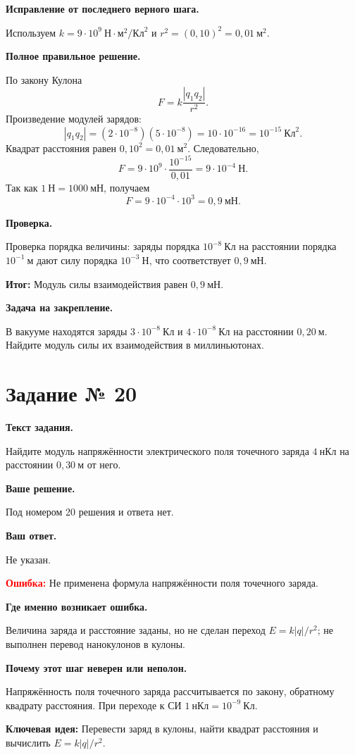 \documentclass[11pt,a4paper]{article}
\newcommand{\reviewblock}[2]{\par\medskip\noindent\textbf{#1}\par\noindent#2\par}
\newcommand{\errorblock}[1]{\par\medskip\noindent\textcolor{red}{\textbf{Ошибка:}} #1\par}
\newcommand{\ideablock}[1]{\par\medskip\noindent\textcolor{blue!60!black}{\textbf{Ключевая идея:}} #1\par}
\newcommand{\resultblock}[1]{\par\medskip\noindent\textcolor{teal!60!black}{\textbf{Итог:}} #1\par}
\begin{document}
\reviewblock{Исправление от последнего верного шага.}{Используем $k=9\cdot10^9\ \text{Н}\cdot\text{м}^2/\text{Кл}^2$ и $r^2=(0{,}10)^2=0{,}01\ \text{м}^2$.}

\reviewblock{Полное правильное решение.}{По закону Кулона
\[F=k\frac{|q_1q_2|}{r^2}.\]
Произведение модулей зарядов:
\[|q_1q_2|=(2\cdot10^{-8})(5\cdot10^{-8})=10\cdot10^{-16}=10^{-15}\ \text{Кл}^2.\]
Квадрат расстояния равен $0{,}10^2=0{,}01\ \text{м}^2$. Следовательно,
\[F=9\cdot10^9\cdot\frac{10^{-15}}{0{,}01}=9\cdot10^{-4}\ \text{Н}.\]
Так как $1\ \text{Н}=1000\ \text{мН}$, получаем
\[F=9\cdot10^{-4}\cdot10^3=0{,}9\ \text{мН}.\]}

\reviewblock{Проверка.}{Проверка порядка величины: заряды порядка $10^{-8}\ \text{Кл}$ на расстоянии порядка $10^{-1}\ \text{м}$ дают силу порядка $10^{-3}\ \text{Н}$, что соответствует $0{,}9\ \text{мН}$.}

\resultblock{Модуль силы взаимодействия равен $0{,}9\ \text{мН}$.}

\reviewblock{Задача на закрепление.}{В вакууме находятся заряды $3\cdot10^{-8}\ \text{Кл}$ и $4\cdot10^{-8}\ \text{Кл}$ на расстоянии $0{,}20\ \text{м}$. Найдите модуль силы их взаимодействия в миллиньютонах.}
\newpage
{}\label{task:20}

\section*{Задание № 20}

\reviewblock{Текст задания.}{Найдите модуль напряжённости электрического поля точечного заряда $4\ \text{нКл}$ на расстоянии $0{,}30\ \text{м}$ от него.}

\reviewblock{Ваше решение.}{Под номером 20 решения и ответа нет.}

\reviewblock{Ваш ответ.}{Не указан.}

\errorblock{Не применена формула напряжённости поля точечного заряда.}

\reviewblock{Где именно возникает ошибка.}{Величина заряда и расстояние заданы, но не сделан переход $E=k|q|/r^2$; не выполнен перевод нанокулонов в кулоны.}

\reviewblock{Почему этот шаг неверен или неполон.}{Напряжённость поля точечного заряда рассчитывается по закону, обратному квадрату расстояния. При переходе к СИ $1\ \text{нКл}=10^{-9}\ \text{Кл}$.}

\ideablock{Перевести заряд в кулоны, найти квадрат расстояния и вычислить $E=k|q|/r^2$.}
\end{document}
